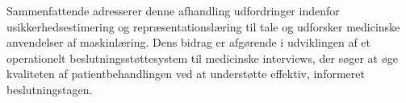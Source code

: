Sammenfattende adresserer denne afhandling udfordringer indenfor usikkerhedsestimering og repræsentationslæring til tale og udforsker medicinske anvendelser af maskinlæring. 
Dens bidrag er afgørende i udviklingen af et operationelt beslutningsstøttesystem til medicinske interviews, der søger at øge kvaliteten af patientbehandlingen ved at understøtte effektiv, informeret beslutningstagen.
